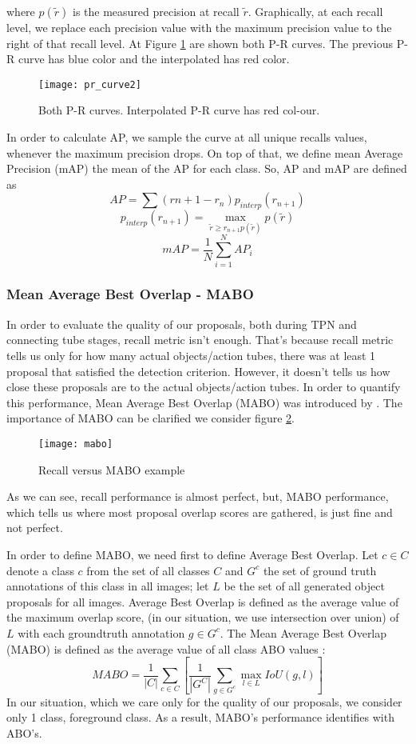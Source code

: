 where $p(\tilde{r})$ is the measured precision at recall $\tilde{r}$. Graphically, at each recall level, we replace each precision value
with the maximum precision value to the right of that recall level.  At Figure \ref{fig:pr_curve2} are shown both P-R curves. The previous P-R curve has blue
color and the interpolated has red color.

\begin{figure}[h]
  \centering
  \texttt{[image: pr\_curve2]}
  \caption{Both P-R curves. Interpolated P-R curve has red col-our.}
  \label{fig:pr_curve2}
\end{figure}

In order to calculate AP, we sample the curve at all unique recalls values, whenever the maximum precision drops. On top of that, we define mean Average Precision (mAP)
the mean of the AP for each class. So, AP and mAP are defined as
\[  AP = \sum (r{n+1} - r_n) p_{interp} (r_{n+1}) \]
\[ p_{interp}(r_{n+1}) = \max_{\tilde{r} \ge r_{n+1} p(\tilde{r})}p(\tilde{r}) \]
\[ mAP = \frac{1}{N} \sum_{i=1}^N AP_i \]

\subsubsection{Mean Average Best Overlap - MABO}

In order to evaluate the quality of our proposals, both during TPN and connecting tube stages, recall metric isn't enough.
That's because recall metric tells us only for how many actual objects/action tubes, there was at least 1 proposal that satisfied the detection
criterion. However, it doesn't tells us how close these proposals are to the actual objects/action tubes. In order to quantify this performance,
Mean Average Best Overlap (MABO) was introduced by \cite{DBLP:journals/corr/WinschelLE16}. The importance of MABO can be clarified 
we consider figure \ref{fig:mabo_fig}.

\begin{figure}[h]
  \centering
  \texttt{[image: mabo]}
  \caption{Recall versus MABO example}
  \label{fig:mabo_fig}
\end{figure}

As we can see, recall performance is almost perfect, but, MABO performance, which tells us where most proposal overlap scores are gathered,
is just fine and not perfect. \par
In order to define MABO, we need first to define Average Best Overlap. Let $ c \in C$ denote a class $c$ from the set of all
classes $C$ and $G^c$ the set of ground truth annotations of this class in all images; let $L$ be the set of all generated object proposals
for all images. Average Best Overlap is defined as the average value of the maximum overlap score, (in our situation, we use intersection
over union) of $L$ with each groundtruth annotation $g \in G^c$. The Mean Average Best Overlap (MABO) is defined as the average value of all
class ABO values :
\[ MABO = \frac{1}{|C|} \sum_{c \in C} [ \frac {1}{|G^C|} \sum_{g \in G^c} \max_{l \in L} IoU(g,l)]  \]
In our situation, which we care only for the quality of our proposals,  we consider only 1 class, foreground class. As a result, MABO's performance identifies with ABO's.

